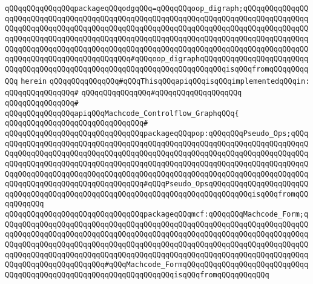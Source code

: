 \verb|qQQqqQQqqQQqqQQqpackageqQQqodgqQQq=qQQqqQQqoop_digraph;qQQqqQQqqQQqqQQqqQQqqQQqqQQqqQQqqQQqqQQqqQQqqQQqqQQqqQQqqQQqqQQqqQQqqQQqqQQqqQQqqQQqqQQqqQQqqQQqqQQqqQQqqQQqqQQqqQQqqQQqqQQqqQQqqQQqqQQqqQQqqQQqqQQqqQQqqQQqqQQqqQQqqQQqqQQqqQQqqQQqqQQqqQQqqQQqqQQqqQQqqQQqqQQqqQQqqQQqqQQqqQQqqQQqqQQqqQQqqQQqqQQqqQQqqQQqqQQqqQQqqQQqqQQqqQQqqQQqqQQqqQQqqQQqqQQqqQQqqQQqqQQqqQQqqQQqqQQqqQQqqQQq#qQQqoop_digraphqQQqqQQqqQQqqQQqqQQqqQQqqQQqqQQqqQQqqQQqqQQqqQQqqQQqqQQqqQQqqQQqqQQqqQQqqQQqisqQQqfromqQQqqQQqqQQq|\newline
\verb|herein|\newline
\newline
\verb|qQQqqQQqqQQqqQQq#qQQqThisqQQqapiqQQqisqQQqimplementedqQQqin:|\newline
\verb|qQQqqQQqqQQqqQQq#|\newline
\verb|qQQqqQQqqQQqqQQq#qQQqqQQqqQQqqQQqqQQq|\newline
\verb|qQQqqQQqqQQqqQQq#|\newline
\verb|qQQqqQQqqQQqqQQqapiqQQqMachcode_Controlflow_GraphqQQq{|\newline
\verb|qQQqqQQqqQQqqQQqqQQqqQQqqQQqqQQq#|\newline
\verb|qQQqqQQqqQQqqQQqqQQqqQQqqQQqqQQqpackageqQQqpop:qQQqqQQqPseudo_Ops;qQQqqQQqqQQqqQQqqQQqqQQqqQQqqQQqqQQqqQQqqQQqqQQqqQQqqQQqqQQqqQQqqQQqqQQqqQQqqQQqqQQqqQQqqQQqqQQqqQQqqQQqqQQqqQQqqQQqqQQqqQQqqQQqqQQqqQQqqQQqqQQqqQQqqQQqqQQqqQQqqQQqqQQqqQQqqQQqqQQqqQQqqQQqqQQqqQQqqQQqqQQqqQQqqQQqqQQqqQQqqQQqqQQqqQQqqQQqqQQqqQQqqQQqqQQqqQQqqQQqqQQqqQQqqQQqqQQqqQQqqQQqqQQqqQQqqQQqqQQqqQQqqQQqqQQqqQQq#qQQqPseudo_OpsqQQqqQQqqQQqqQQqqQQqqQQqqQQqqQQqqQQqqQQqqQQqqQQqqQQqqQQqqQQqqQQqqQQqqQQqqQQqqQQqisqQQqfromqQQqqQQqqQQq|\newline
\verb|qQQqqQQqqQQqqQQqqQQqqQQqqQQqqQQqpackageqQQqmcf:qQQqqQQqMachcode_Form;qQQqqQQqqQQqqQQqqQQqqQQqqQQqqQQqqQQqqQQqqQQqqQQqqQQqqQQqqQQqqQQqqQQqqQQqqQQqqQQqqQQqqQQqqQQqqQQqqQQqqQQqqQQqqQQqqQQqqQQqqQQqqQQqqQQqqQQqqQQqqQQqqQQqqQQqqQQqqQQqqQQqqQQqqQQqqQQqqQQqqQQqqQQqqQQqqQQqqQQqqQQqqQQqqQQqqQQqqQQqqQQqqQQqqQQqqQQqqQQqqQQqqQQqqQQqqQQqqQQqqQQqqQQqqQQqqQQqqQQqqQQqqQQqqQQqqQQqqQQqqQQq#qQQqMachcode_FormqQQqqQQqqQQqqQQqqQQqqQQqqQQqqQQqqQQqqQQqqQQqqQQqqQQqqQQqqQQqqQQqqQQqisqQQqfromqQQqqQQqqQQq|\newline
